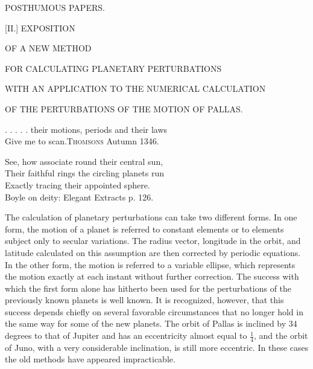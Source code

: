\clearpage
{}
\begin{center}
{\Large POSTHUMOUS PAPERS.\par}
\bigskip
{\large [II.] EXPOSITION\par}
{\large OF A NEW METHOD\par}
FOR CALCULATING PLANETARY PERTURBATIONS\par
WITH AN APPLICATION TO THE NUMERICAL CALCULATION\par
OF THE PERTURBATIONS OF THE MOTION OF PALLAS.
\end{center}
\begin{flushright}
\begin{minipage}{.94\textwidth}
\small\raggedright
. . . . . their motions, periods and their laws\\
Give me to scan.\quad \textsc{Thomsons} Autumn 1346.
\par\medskip
See, how associate round their central sun,\\
Their faithful rings the circling planets run\\
Exactly tracing their appointed sphere.\\
\hspace*{1em}Boyle on deity: Elegant Extracts p. 126.
\end{minipage}
\end{flushright}
\noindent\hspace*{\parindent}The calculation of planetary perturbations can take two different forms. In one form, the motion of a planet is referred to constant elements or to elements subject only to secular variations. The radius vector, longitude in the orbit, and latitude calculated on this assumption are then corrected by periodic equations. In the other form, the motion is referred to a variable ellipse, which represents the motion exactly at each instant without further correction. The success with which the first form alone has hitherto been used for the perturbations of the previously known planets is well known. It is recognized, however, that this success depends chiefly on several favorable circumstances that no longer hold in the same way for some of the new planets. The orbit of Pallas is inclined by 34 degrees to that of Jupiter and has an eccentricity almost equal to \(\frac{1}{4}\), and the orbit of Juno, with a very considerable inclination, is still more eccentric. In these cases the old methods have appeared impracticable.
